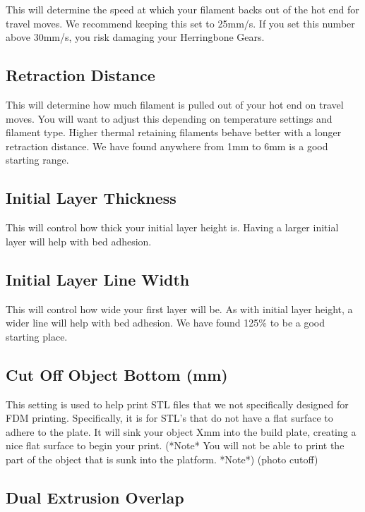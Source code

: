 This will determine the speed at which your filament backs out of the hot end for travel moves. We recommend keeping this set to 25mm/s. If you set this number above 30mm/s, you risk damaging your Herringbone Gears.

\subsection{Retraction Distance}

This will determine how much filament is pulled out of your hot end on travel moves. You will want to adjust this depending on temperature settings and filament type. Higher thermal retaining filaments behave better with a longer retraction distance. We have found anywhere from 1mm to 6mm is a good starting range.

\subsection{Initial Layer Thickness}

This will control how thick your initial layer height is. Having a larger initial layer will help with bed adhesion.

\subsection{Initial Layer Line Width}

This will control how wide your first layer will be. As with initial layer height, a wider line will help with bed adhesion. We have found 125\% to be a good starting place.

\subsection{Cut Off Object Bottom (mm)}

This setting is used to help print STL files that we not specifically designed for FDM printing. Specifically, it is for STL's that do not have a flat surface to adhere to the plate. It will sink your object Xmm into the build plate, creating a nice flat surface to begin your print. (*Note* You will not be able to print the part of the object that is sunk into the platform. *Note*) (photo cutoff)

\subsection{Dual Extrusion Overlap}


